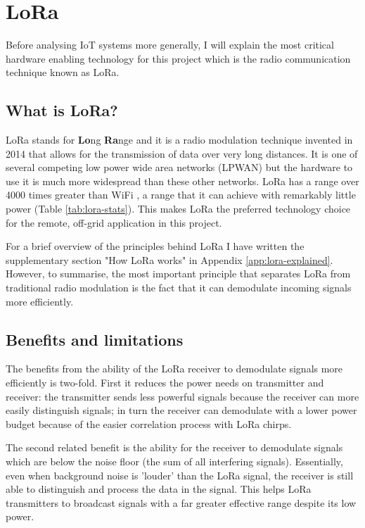 \section{LoRa}\label{sec:lora}

Before analysing IoT systems more generally, I will explain the most critical
hardware enabling technology for this project which is the radio communication
technique known as LoRa.

\subsection{What is LoRa?}

LoRa stands for \textbf{Lo}ng \textbf{Ra}nge and it is a radio modulation
technique invented in 2014 that allows for the transmission of data over very
long distances. It is one of several competing low power wide area networks
(LPWAN) but the hardware to use it is much more widespread than these other
networks. LoRa has a range over 4000 times greater than WiFi \cite{spiess2019},
a range that it can achieve with remarkably little power (Table
\ref{tab:lora-stats}). This makes LoRa the preferred technology choice for
the remote, off-grid application in this project.

For a brief overview of the principles behind LoRa I have written the
supplementary section "How LoRa works" in Appendix \ref{app:lora-explained}.
However, to summarise, the most important principle that separates LoRa from
traditional radio modulation is the fact that it can demodulate incoming signals
more efficiently.

\subsection{Benefits and limitations}\label{sec:lora-benefits}

The benefits from the ability of the LoRa receiver to demodulate signals more
efficiently is two-fold. First it reduces the power needs on transmitter and
receiver: the transmitter sends less powerful signals because the receiver can
more easily distinguish signals; in turn the receiver can demodulate with a
lower power budget because of the easier correlation process with LoRa chirps.

The second related benefit is the ability for the receiver to demodulate signals
which are below the noise floor (the sum of all interfering signals).
Essentially, even when background noise is 'louder' than the LoRa signal, the
receiver is still able to distinguish and process the data in the signal. This
helps LoRa transmitters to broadcast signals with a far greater effective range
despite its low power.

